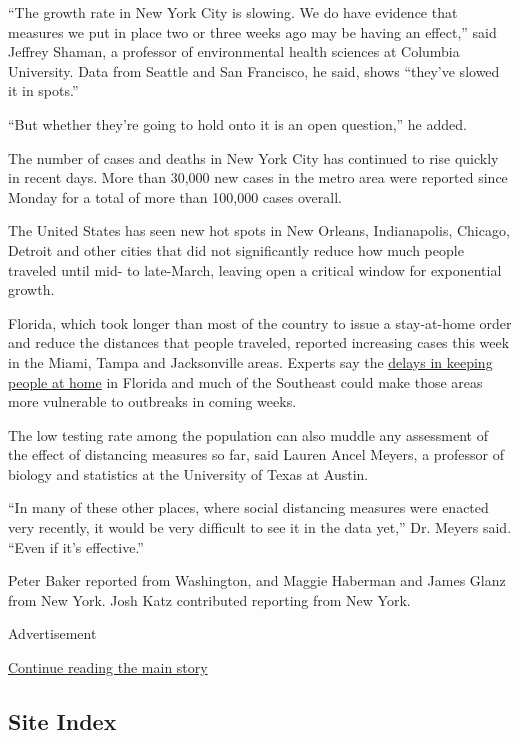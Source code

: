``The growth rate in New York City is slowing. We do have evidence that
measures we put in place two or three weeks ago may be having an
effect,'' said Jeffrey Shaman, a professor of environmental health
sciences at Columbia University. Data from Seattle and San Francisco, he
said, shows ``they've slowed it in spots.''

``But whether they're going to hold onto it is an open question,'' he
added.

The number of cases and deaths in New York City has continued to rise
quickly in recent days. More than 30,000 new cases in the metro area
were reported since Monday for a total of more than 100,000 cases
overall.

The United States has seen new hot spots in New Orleans, Indianapolis,
Chicago, Detroit and other cities that did not significantly reduce how
much people traveled until mid- to late-March, leaving open a critical
window for exponential growth.

Florida, which took longer than most of the country to issue a
stay-at-home order and reduce the distances that people traveled,
reported increasing cases this week in the Miami, Tampa and Jacksonville
areas. Experts say the
\href{https://www.nytimes.com/interactive/2020/04/02/us/coronavirus-social-distancing.html}{delays
in keeping people at home} in Florida and much of the Southeast could
make those areas more vulnerable to outbreaks in coming weeks.

The low testing rate among the population can also muddle any assessment
of the effect of distancing measures so far, said Lauren Ancel Meyers, a
professor of biology and statistics at the University of Texas at
Austin.

``In many of these other places, where social distancing measures were
enacted very recently, it would be very difficult to see it in the data
yet,'' Dr. Meyers said. ``Even if it's effective.''

Peter Baker reported from Washington, and Maggie Haberman and James
Glanz from New York. Josh Katz contributed reporting from New York.

Advertisement

\protect\hyperlink{after-bottom}{Continue reading the main story}

\hypertarget{site-index}{%
\subsection{Site Index}\label{site-index}}

